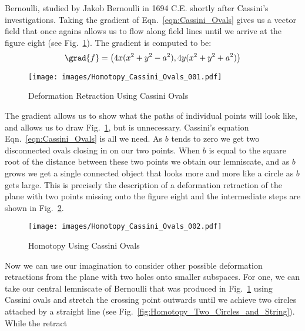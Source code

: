 \documentclass{article}                                                        %
\begin{document}
        Bernoulli, studied by Jakob Bernoulli in 1694 C.E. shortly after
        Cassini's investigations. Taking the gradient of
        Eqn.~\ref{eqn:Cassini_Ovals} gives us a vector field that once agains
        allows us to flow along field lines until we arrive at the figure eight
        (see Fig.~\ref{fig:Deformation_Retraction_Cassini_Ovals}). The gradient
        is computed to be:
        \begin{equation}
            \grad{f}=\big(4x(x^{2}+y^{2}-a^{2}), 4y(x^{2}+y^{2}+a^2)\big)
        \end{equation}
        \begin{figure}[H]
            \centering
            \captionsetup{type=figure}
            \texttt{[image: images/Homotopy\_Cassini\_Ovals\_001.pdf]}
            \caption{Deformation Retraction Using Cassini Ovals}
            \label{fig:Deformation_Retraction_Cassini_Ovals}
        \end{figure}
        The gradient allows us to show what the paths of individual points will
        look like, and allows us to draw
        Fig.~\ref{fig:Deformation_Retraction_Cassini_Ovals}, but is unnecessary.
        Cassini's equation Eqn.~\ref{eqn:Cassini_Ovals} is all we need. As
        $b$ tends to zero we get two disconnected ovals closing in on our two
        points. When $b$ is equal to the square root of the distance between
        these two points we obtain our lemniscate, and as $b$ grows we get a
        single connected object that looks more and more like a circle as $b$
        gets large. This is precisely the description of a deformation
        retraction of the plane with two points missing onto the figure eight
        and the intermediate steps are shown in
        Fig.~\ref{fig:Homotopy_Cassini_Ovals}.
        \begin{figure}[H]
            \centering
            \captionsetup{type=figure}
            \texttt{[image: images/Homotopy\_Cassini\_Ovals\_002.pdf]}
            \caption{Homotopy Using Cassini Ovals}
            \label{fig:Homotopy_Cassini_Ovals}
        \end{figure}
        Now we can use our imagination to consider other possible deformation
        retractions from the plane with two holes onto smaller subspaces. For
        one, we can take our central lemniscate of Bernoulli that was produced
        in Fig.~\ref{fig:Deformation_Retraction_Cassini_Ovals} using Cassini
        ovals and stretch the crossing point outwards until we achieve two
        circles attached by a straight line
        (see Fig.~\ref{fig:Homotopy_Two_Circles_and_String}). While the retract
\end{document}
